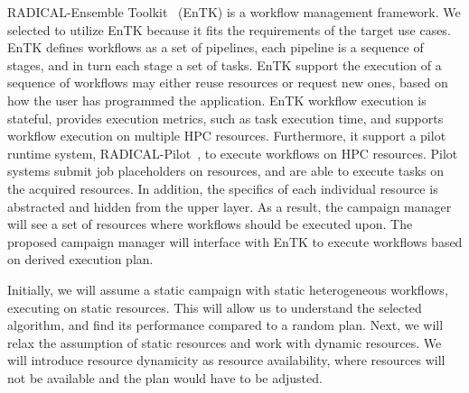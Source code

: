 RADICAL-Ensemble Toolkit~\cite{balasubramanian2018harnessing} (EnTK) is a workflow management framework.
We selected to utilize EnTK because it fits the requirements of the target use cases.
EnTK defines workflows as a set of pipelines, each pipeline is a sequence of stages, and in turn each stage a set of tasks.
EnTK support the execution of a sequence of workflows may either reuse resources or request new ones, based on how the user has programmed the application.
EnTK workflow execution is stateful, provides execution metrics, such as task execution time, and supports workflow execution on multiple HPC resources.
Furthermore, it support a pilot runtime system, RADICAL-Pilot~\cite{merzky2019using}, to execute workflows on HPC resources.
Pilot systems submit job placeholders on resources, and are able to execute tasks on the acquired resources.
In addition, the specifics of each individual resource is abstracted and hidden from the upper layer.
As a result, the campaign manager will see a set of resources where workflows should be executed upon.
The proposed campaign manager will interface with EnTK to execute workflows based on derived execution plan.


Initially, we will assume a static campaign with static heterogeneous workflows, executing on static resources.
This will allow us to understand the selected algorithm, and find its performance compared to a random plan.
Next, we will relax the assumption of static resources and work with dynamic resources.
We will introduce resource dynamicity as resource availability, where resources will not be available and the plan would have to be adjusted.
